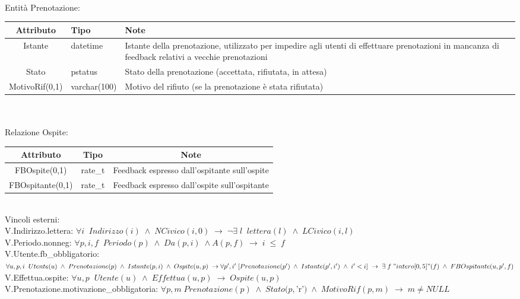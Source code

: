\documentclass[a4paper,12pt]{report}
\begin{document}
      \vspace{24pt} \\
      Entità Prenotazione: \\
      \begin{tabular}{|c|p{}|p{}|}
        \hline Attributo & Tipo & Note \\
        \hline Istante & datetime & Istante della prenotazione, utilizzato per impedire agli utenti di effettuare prenotazioni in mancanza di feedback relativi a vecchie prenotazioni \\
        \hline Stato & pstatus & Stato della prenotazione (accettata, rifiutata, in attesa) \\
        \hline MotivoRif(0,1) & varchar(100) & Motivo del rifiuto (se la prenotazione è stata rifiutata) \\
        \hline
      \end{tabular} \\
      \vspace{24pt} \\
      Relazione Ospite: \\
      \begin{tabular}{|c|c|c|}
        \hline Attributo & Tipo & Note \\
        \hline FBOspite(0,1) & rate\_t & Feedback espresso dall'ospitante sull'ospite \\
        \hline FBOspitante(0,1) & rate\_t & Feedback espresso dall'ospite sull'ospitante \\
        \hline
      \end{tabular} \\

      \vspace{24pt}
      \large Vincoli esterni: \\
      \normalsize
      V.Indirizzo.lettera: $\forall i \;\; Indirizzo(i) \; \wedge \; NCivico(i, 0) \; \rightarrow \; \neg \exists \; l \;\; lettera(l) \; \wedge \; LCivico(i, l)$ \\
      V.Periodo.nonneg: $\forall p,i,f \;\; Periodo(p) \; \wedge \; Da(p, i) \; \wedge A(p, f) \; \rightarrow \; i \; \leq \; f$ \\
      V.Utente.fb\_obbligatorio: $\forall u,p,i \;\; Utente(u) \; \wedge \; Prenotazione(p) \; \wedge \; Istante(p, i) \; \wedge \; Ospite(u, p) \; \rightarrow \forall p',i' \; [Prenotazione(p') \; \wedge \; Istante(p', i') \; \wedge \; i' < i] \; \rightarrow \; \exists \; f \; "intero[0,5]"(f) \; \wedge \; FBOspitante(u, p', f)$ \\
      V.Effettua.ospite: $\forall u,p \;\; Utente(u) \; \wedge \; Effettua(u, p) \; \rightarrow \; Ospite(u, p)$ \\
      V.Prenotazione.motivazione\_obbligatoria: $\forall p,m \; Prenotazione(p) \; \wedge \; Stato(p, $'r'$) \; \wedge \; MotivoRif(p, m) \; \rightarrow \; m \neq NULL$ \\
\end{document}
